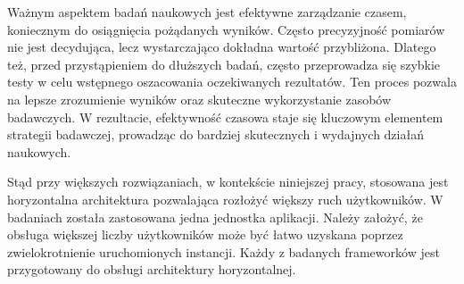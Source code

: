 Ważnym aspektem badań naukowych jest efektywne zarządzanie czasem, koniecznym do osiągnięcia pożądanych wyników.
Często precyzyjność pomiarów nie jest decydująca, lecz wystarczająco dokładna wartość przybliżona.
Dlatego też, przed przystąpieniem do dłuższych badań, często przeprowadza się szybkie testy w celu wstępnego oszacowania oczekiwanych rezultatów.
Ten proces pozwala na lepsze zrozumienie wyników oraz skuteczne wykorzystanie zasobów badawczych.
W rezultacie, efektywność czasowa staje się kluczowym elementem strategii badawczej, prowadząc do bardziej skutecznych i wydajnych działań naukowych.

Stąd przy większych rozwiązaniach, w kontekście niniejszej pracy, stosowana jest horyzontalna architektura pozwalająca rozłożyć większy ruch użytkowników.
W badaniach została zastosowana jedna jednostka aplikacji.
Należy założyć, że obsługa większej liczby użytkowników może być łatwo uzyskana poprzez zwielokrotnienie uruchomionych instancji.
Każdy z badanych frameworków jest przygotowany do obsługi architektury horyzontalnej.